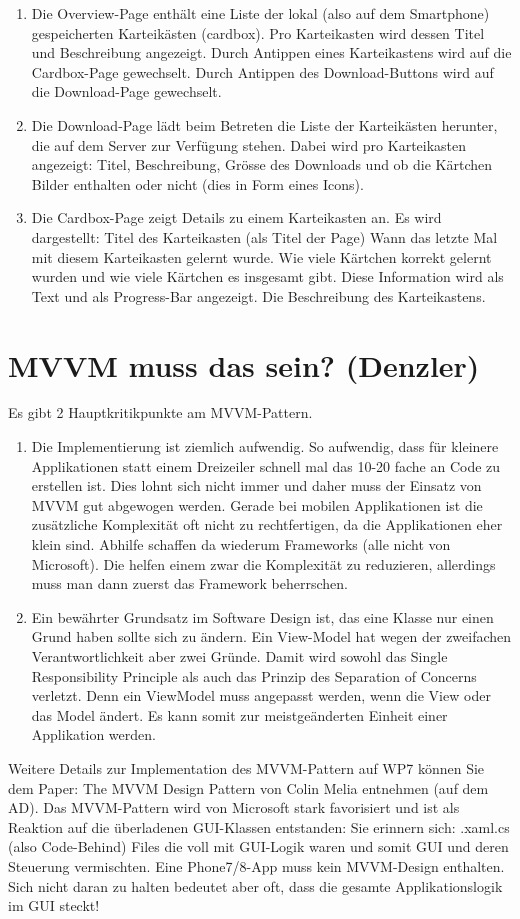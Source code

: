 \documentclass[a4paper,10pt]{scrreprt}
\begin{document}
\begin{enumerate}
\item Die Overview-Page enthält eine Liste der lokal (also auf dem Smartphone) gespeicherten Karteikästen
(cardbox). Pro Karteikasten wird dessen Titel und Beschreibung angezeigt.
Durch Antippen eines Karteikastens wird auf die Cardbox-Page gewechselt.
Durch Antippen des Download-Buttons wird auf die Download-Page gewechselt.
\item Die Download-Page lädt beim Betreten die Liste der Karteikästen herunter, die auf dem Server zur
Verfügung stehen. Dabei wird pro Karteikasten angezeigt: Titel, Beschreibung, Grösse des Downloads und
ob die Kärtchen Bilder enthalten oder nicht (dies in Form eines Icons).
\item  Die Cardbox-Page zeigt Details zu einem Karteikasten an. Es wird dargestellt:
\subitem Titel des Karteikasten (als Titel der Page)
\subitem Wann das letzte Mal mit diesem Karteikasten gelernt wurde.
\subitem Wie viele Kärtchen korrekt gelernt wurden und wie viele Kärtchen es insgesamt gibt. Diese
Information wird als Text und als Progress-Bar angezeigt.
\subitem Die Beschreibung des Karteikastens.
\end{enumerate}

\section{MVVM muss das sein? (Denzler)}
Es gibt 2 Hauptkritikpunkte am MVVM-Pattern.
\begin{enumerate}


\item  Die Implementierung ist ziemlich aufwendig. So aufwendig, dass für kleinere Applikationen statt einem
Dreizeiler schnell mal das 10-20 fache an Code zu erstellen ist. Dies lohnt sich nicht immer und daher
muss der Einsatz von MVVM gut abgewogen werden. Gerade bei mobilen Applikationen ist die
zusätzliche Komplexität oft nicht zu rechtfertigen, da die Applikationen eher klein sind. Abhilfe schaffen
da wiederum Frameworks (alle nicht von Microsoft). Die helfen einem zwar die Komplexität zu
reduzieren, allerdings muss man dann zuerst das Framework beherrschen.
\item Ein bewährter Grundsatz im Software Design ist, das eine Klasse nur einen Grund haben sollte sich zu
ändern. Ein View-Model hat wegen der zweifachen Verantwortlichkeit aber zwei Gründe. Damit wird
sowohl das Single Responsibility Principle als auch das Prinzip des Separation of Concerns verletzt. Denn
ein ViewModel muss angepasst werden, wenn die View oder das Model ändert. Es kann somit zur
meistgeänderten Einheit einer Applikation werden.
\end{enumerate}
Weitere Details zur Implementation des MVVM-Pattern auf WP7 können Sie dem Paper: The MVVM Design
Pattern von Colin Melia entnehmen (auf dem AD). Das MVVM-Pattern wird von Microsoft stark favorisiert und
ist als Reaktion auf die überladenen GUI-Klassen entstanden: Sie erinnern sich: .xaml.cs (also Code-Behind) Files
die voll mit GUI-Logik waren und somit GUI und deren Steuerung vermischten.
Eine Phone7/8-App muss kein MVVM-Design enthalten. Sich nicht daran zu halten bedeutet aber oft, dass die
gesamte Applikationslogik im GUI steckt!
\end{document}

